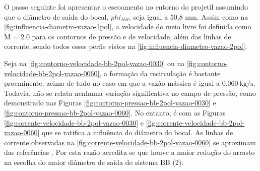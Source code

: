 O passo seguinte foi apresentar o escoamento no entorno do projetil assumindo que o diâmetro de saída do bocal, \(phi_{BB}\), seja igual a 50,8 mm. Assim como na \autoref{fig:influencia-diametro-vazao-1pol}, a velocidade do meio livre foi definida como M = \num{2,0} para os contornos de pressão e de velocidade, além das linhas de corrente, sendo todos esses perfis vistos na \autoref{fig:influencia-diametro-vazao-2pol}.

Seja na \autoref{fig:contorno-velocidade-bb-2pol-vazao-0030} ou na \autoref{fig:contorno-velocidade-bb-2pol-vazao-0060}, a formação da recirculação é bastante proeminente, acima de tudo no caso em que a vazão mássica é igual a \(\qty{0,060}{\kilogram\per\second}\). Todavia, não se relata nenhuma variação significativa no campo de pressão, como demonstrado nas Figuras \ref{fig:contorno-pressao-bb-2pol-vazao-0030} e \ref{fig:contorno-pressao-bb-2pol-vazao-0060}. No entanto, é com as Figuras \ref{fig:corrente-velocidade-bb-2pol-vazao-0030} e \ref{fig:corrente-velocidade-bb-2pol-vazao-0060} que se ratifica a influência do diâmetro do bocal. As linhas de corrente observadas na \autoref{fig:corrente-velocidade-bb-2pol-vazao-0060} se aproximam das referências \cite{Sahu1985,Mahmoud2009,Lucena2020}. Por esta razão acredita-se que houve a maior redução do arrasto na escolha do maior diâmetro de saída do sistema BB (\qty{2}{\polegada}).

